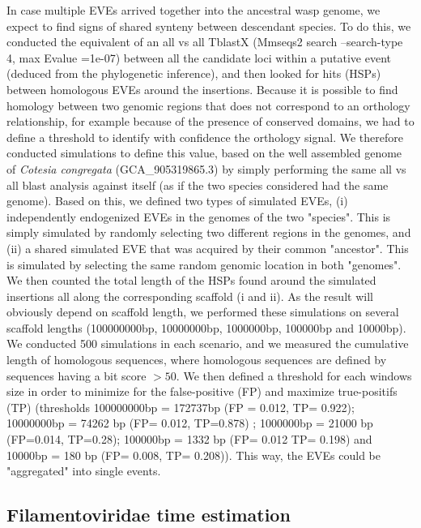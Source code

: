 In case multiple EVEs arrived together into the ancestral wasp genome, we expect to find signs of shared synteny between descendant species. To do this, we conducted the equivalent of an all vs all TblastX (Mmseqs2 search --search-type 4, max Evalue =1e-07) between all the candidate loci within a putative event (deduced from the phylogenetic inference), and then looked for hits (HSPs) between homologous EVEs around the insertions. Because it is possible to find homology between two genomic regions that does not correspond to an orthology relationship, for example because of the presence of conserved domains, we had to define a threshold to identify with confidence the orthology signal. We therefore conducted simulations to define this value, based on the well assembled genome of \textit{Cotesia congregata} (GCA\_905319865.3) by simply performing the same all vs all blast analysis against itself (as if the two species considered had the same genome). Based on this, we defined two types of simulated EVEs, (i) independently endogenized EVEs in the genomes of the two "species". This is simply simulated by randomly selecting two different regions in the genomes, and (ii) a shared  simulated EVE that was acquired by their common "ancestor". This is simulated by selecting  the same random genomic location in both "genomes". We then counted the total length of the HSPs found around the simulated insertions all along the corresponding scaffold (i and ii). As the result will obviously depend on scaffold length, we performed these simulations on several scaffold lengths (100000000bp, 10000000bp, 1000000bp, 100000bp and 10000bp). 
We conducted 500 simulations in each scenario, and we measured the cumulative length of homologous sequences, where homologous sequences are defined by sequences having a bit score $>50$. We then defined a threshold for each windows size in order to minimize for the false-positive (FP) and maximize true-positifs (TP)  (thresholds 100000000bp = 172737bp (FP = 0.012, TP= 0.922); 10000000bp = 74262 bp (FP= 0.012, TP=0.878) ; 1000000bp = 21000 bp (FP=0.014, TP=0.28); 100000bp = 1332 bp (FP= 0.012 TP= 0.198) and  10000bp = 180 bp (FP= 0.008, TP= 0.208)). 
This way, the EVEs could be "aggregated" into single events. 

\subsection{Filamentoviridae time estimation}

